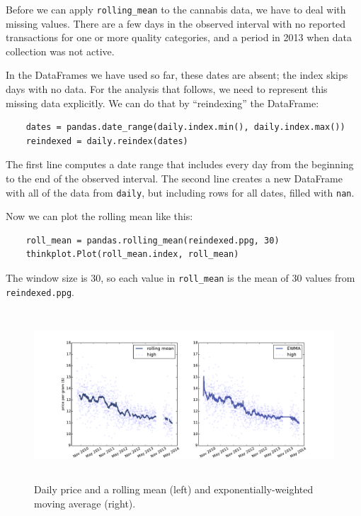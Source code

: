 \documentclass[12pt]{book}
\begin{document}
Before we can apply \verb"rolling_mean" to the cannabis data, we
have to deal with missing values.  There are a few days in the
observed interval with no reported transactions for one or more
quality categories, and a period in 2013 when data collection was
not active.

In the DataFrames we have used so far, these dates are absent;
the index skips days with no data.  For the analysis that follows,
we need to represent this missing data explicitly.  We can do
that by ``reindexing'' the DataFrame:

\begin{verbatim}
    dates = pandas.date_range(daily.index.min(), daily.index.max())
    reindexed = daily.reindex(dates)
\end{verbatim}

The first line computes a date range that includes every day from the
beginning to the end of the observed interval.  The second line
creates a new DataFrame with all of the data from {\tt daily}, but
including rows for all dates, filled with {\tt nan}.

Now we can plot the rolling mean like this:

\begin{verbatim}
    roll_mean = pandas.rolling_mean(reindexed.ppg, 30)
    thinkplot.Plot(roll_mean.index, roll_mean)
\end{verbatim}

The window size is 30, so each value in \verb"roll_mean" is
the mean of 30 values from {\tt reindexed.ppg}.  

\begin{figure}
\centerline{\includegraphics[height=2.5in]{figs/timeseries10.pdf}}
\caption{Daily price and a rolling mean (left) and exponentially-weighted
moving average (right).}
\label{timeseries10}
\end{figure}
\end{document}
